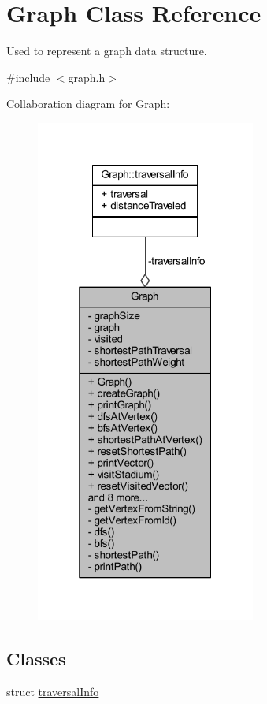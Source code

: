 \hypertarget{class_graph}{}\section{Graph Class Reference}
\label{class_graph}


Used to represent a graph data structure.  




{\ttfamily \#include $<$graph.\+h$>$}



Collaboration diagram for Graph\+:
\nopagebreak
\begin{figure}[H]
\begin{center}
\leavevmode
\includegraphics[width=205pt]{class_graph__coll__graph}
\end{center}
\end{figure}
\subsection*{Classes}
\begin{DoxyCompactItemize}
\item 
struct \hyperlink{struct_graph_1_1traversal_info}{traversal\+Info}
\end{DoxyCompactItemize}
